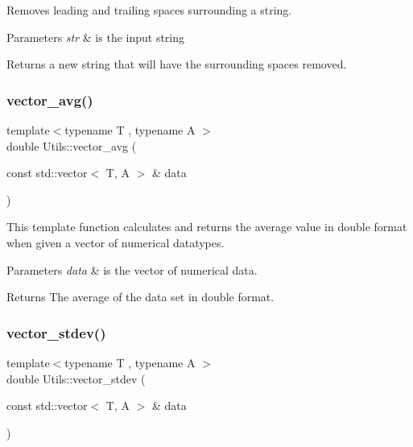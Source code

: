Removes leading and trailing spaces surrounding a string. 


\begin{DoxyParams}{Parameters}
{\em str} & is the input string \\
\hline
\end{DoxyParams}
\begin{DoxyReturn}{Returns}
a new string that will have the surrounding spaces removed. 
\end{DoxyReturn}
\mbox{\label{namespace_utils_acbc030ce708229ea393215fe13e6377b}} 
\subsubsection{\texorpdfstring{vector\+\_\+avg()}{vector\_avg()}}
{\footnotesize\ttfamily template$<$typename T , typename A $>$ \\
double Utils\+::vector\+\_\+avg (\begin{DoxyParamCaption}\item[{const std\+::vector$<$ T, A $>$ \&}]{data }\end{DoxyParamCaption})}



This template function calculates and returns the average value in double format when given a vector of numerical datatypes. 


\begin{DoxyParams}{Parameters}
{\em data} & is the vector of numerical data. \\
\hline
\end{DoxyParams}
\begin{DoxyReturn}{Returns}
The average of the data set in double format. 
\end{DoxyReturn}
\mbox{\label{namespace_utils_a6bfa9b066d7c0967807d588024c15d4e}} 
\subsubsection{\texorpdfstring{vector\+\_\+stdev()}{vector\_stdev()}}
{\footnotesize\ttfamily template$<$typename T , typename A $>$ \\
double Utils\+::vector\+\_\+stdev (\begin{DoxyParamCaption}\item[{const std\+::vector$<$ T, A $>$ \&}]{data }\end{DoxyParamCaption})}



